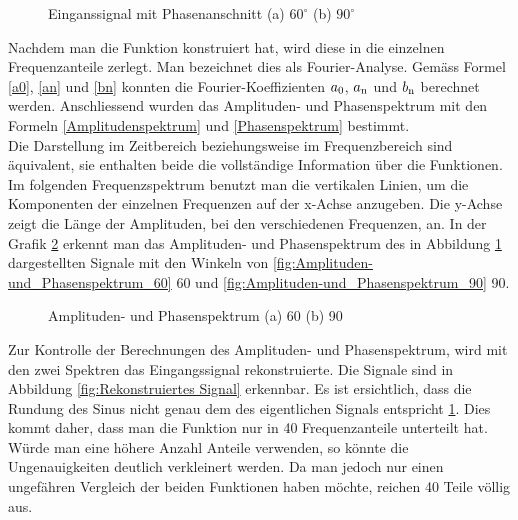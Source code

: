  

\begin{figure}[h]
	\centering
	\qquad
	\caption{Einganssignal mit Phasenanschnitt (a) $60^\circ$ (b) $90^\circ$}
	\label{fig:eingangssignal_mit_Matlab}
\end{figure} 

Nachdem man die Funktion konstruiert hat, wird diese in die einzelnen Frequenzanteile zerlegt. Man bezeichnet dies als Fourier-Analyse. Gemäss Formel \ref{a0}, \ref{an} und \ref{bn} konnten die Fourier-Koeffizienten $a\textsubscript{0}$, $a\textsubscript{n}$ und $b\textsubscript{n}$ berechnet werden. Anschliessend wurden das Amplituden- und Phasenspektrum mit den Formeln \ref{Amplitudenspektrum} und \ref{Phasenspektrum} bestimmt.\\ 
Die Darstellung im Zeitbereich beziehungsweise im Frequenzbereich sind äquivalent, sie enthalten beide die vollständige Information über die Funktionen. Im folgenden Frequenzspektrum benutzt man die vertikalen Linien, um die Komponenten der einzelnen Frequenzen auf der x-Achse anzugeben. Die y-Achse zeigt die Länge der Amplituden, bei den verschiedenen Frequenzen, an. In der Grafik \ref{fig:Amplituden- und Phasenspektrum} erkennt man das Amplituden- und Phasenspektrum des in Abbildung \ref{fig:eingangssignal_mit_Matlab} dargestellten Signale mit den Winkeln von \ref{fig:Amplituden-und_Phasenspektrum_60} 60\textdegree \hspace{0.02cm} und \ref{fig:Amplituden-und_Phasenspektrum_90} 90\textdegree \hspace{0.02cm}.

\begin{figure}[h]
	\centering
	\qquad
	\caption{Amplituden- und Phasenspektrum (a) 60\textdegree \hspace{0.02cm} (b) 90\textdegree}
	\label{fig:Amplituden- und Phasenspektrum}
\end{figure} 

Zur Kontrolle der Berechnungen des Amplituden- und Phasenspektrum, wird mit den zwei Spektren das Eingangssignal rekonstruierte. Die Signale sind in Abbildung \ref{fig:Rekonstruiertes Signal} erkennbar. Es ist ersichtlich, dass die Rundung des Sinus nicht genau dem des eigentlichen Signals entspricht \ref{fig:eingangssignal_mit_Matlab}. Dies kommt daher, dass man die Funktion  \grqq nur\grqq\hspace{0.02cm} in 40 Frequenzanteile unterteilt hat. Würde man eine höhere Anzahl Anteile verwenden, so könnte die Ungenauigkeiten deutlich verkleinert werden. Da man jedoch nur einen ungefähren Vergleich der beiden Funktionen haben möchte, reichen 40 Teile völlig aus. 

